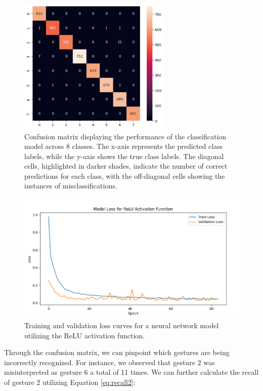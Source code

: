 \begin{figure}[ht!]
	\centering
	\includegraphics[width = 0.65\textwidth]{images/confusion_matrix.pdf}
	\caption{Confusion matrix displaying the performance of the classification model across 8 classes. The x-axis represents the predicted class labels, while the y-axis shows the true class labels. The diagonal cells, highlighted in darker shades, indicate the number of correct predictions for each class, with the off-diagonal cells showing the instances of misclassifications.}
	\label{fig:confusion_matrix}
\end{figure}


\begin{figure}[H]
	\centering
	\includegraphics[width=\textwidth]{images/model_loss_relu.png}
	\caption{Training and validation loss curves for a neural network model utilizing the ReLU activation function.}
	\label{fig:model_loss_relu}
\end{figure}

Through the confusion matrix, we can pinpoint which gestures are being incorrectly recognized. For instance, we observed that gesture 2 was misinterpreted as gesture 6 a total of 11 times. We can further calculate the recall of gesture 2 utilizing Equation \ref{eq:recall2}:

